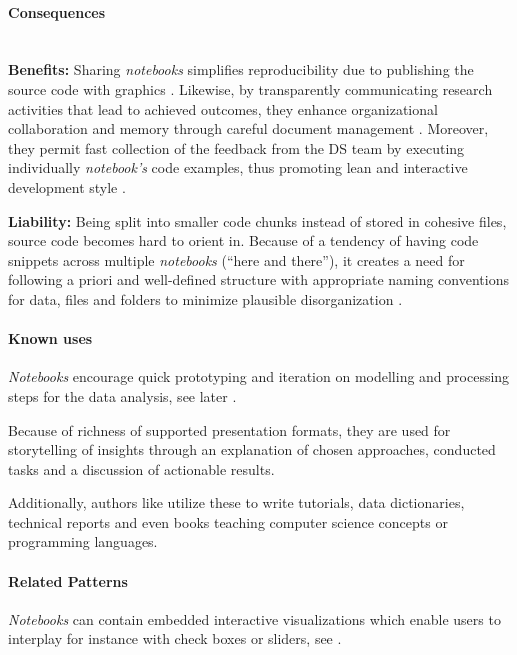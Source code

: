 \paragraph*{Consequences} ~\\
{\hspace*{14.5pt} \textbf{Benefits:} \hspace*{-5.5pt} }
Sharing \emph{notebooks} simplifies reproducibility due to publishing the source code with graphics \parencite{JakeVanderPlas2016PythonHandbook}.
Likewise, by transparently communicating research activities that lead to achieved outcomes, they enhance organizational collaboration and memory through careful document management \parencites{JonJupyter2016}{CharlerSutton2012}.
Moreover, they permit fast collection of the feedback from the \ac{DS} team by executing individually \emph{notebook's} code examples, thus promoting lean and interactive development style \parencites{EslamiAli2012}{CMACanada2003}.

\textbf{Liability:}
Being split into smaller code chunks instead of stored in cohesive files, source code becomes hard to orient in.
Because of a tendency of having code snippets across multiple \emph{notebooks} (\enquote{here and there}), it creates a need for following a priori and well-defined structure with appropriate naming conventions for data, files and folders to minimize plausible disorganization \parencite{FieldCadyDSBook}.

\paragraph*{Known uses}
\begin{compactitem}
   \item \emph{Notebooks} encourage quick prototyping and iteration on modelling and processing steps for the data analysis, see later . 
   \item Because of richness of supported presentation formats, they are used for storytelling of insights through an explanation of chosen approaches, conducted tasks and a discussion of actionable results.
   \item Additionally, authors like \textcite{JakeVanderPlas2016PythonHandbook} utilize these to write tutorials, data dictionaries, technical reports and even books teaching computer science concepts or programming languages.
\end{compactitem}

\paragraph*{Related Patterns}
\emph{Notebooks} can contain embedded interactive visualizations which enable users to interplay for instance with check boxes or sliders, see .

